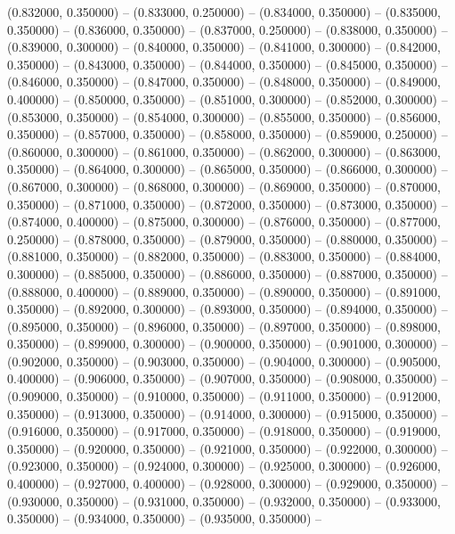 (0.832000, 0.350000) -- 
(0.833000, 0.250000) -- 
(0.834000, 0.350000) -- 
(0.835000, 0.350000) -- 
(0.836000, 0.350000) -- 
(0.837000, 0.250000) -- 
(0.838000, 0.350000) -- 
(0.839000, 0.300000) -- 
(0.840000, 0.350000) -- 
(0.841000, 0.300000) -- 
(0.842000, 0.350000) -- 
(0.843000, 0.350000) -- 
(0.844000, 0.350000) -- 
(0.845000, 0.350000) -- 
(0.846000, 0.350000) -- 
(0.847000, 0.350000) -- 
(0.848000, 0.350000) -- 
(0.849000, 0.400000) -- 
(0.850000, 0.350000) -- 
(0.851000, 0.300000) -- 
(0.852000, 0.300000) -- 
(0.853000, 0.350000) -- 
(0.854000, 0.300000) -- 
(0.855000, 0.350000) -- 
(0.856000, 0.350000) -- 
(0.857000, 0.350000) -- 
(0.858000, 0.350000) -- 
(0.859000, 0.250000) -- 
(0.860000, 0.300000) -- 
(0.861000, 0.350000) -- 
(0.862000, 0.300000) -- 
(0.863000, 0.350000) -- 
(0.864000, 0.300000) -- 
(0.865000, 0.350000) -- 
(0.866000, 0.300000) -- 
(0.867000, 0.300000) -- 
(0.868000, 0.300000) -- 
(0.869000, 0.350000) -- 
(0.870000, 0.350000) -- 
(0.871000, 0.350000) -- 
(0.872000, 0.350000) -- 
(0.873000, 0.350000) -- 
(0.874000, 0.400000) -- 
(0.875000, 0.300000) -- 
(0.876000, 0.350000) -- 
(0.877000, 0.250000) -- 
(0.878000, 0.350000) -- 
(0.879000, 0.350000) -- 
(0.880000, 0.350000) -- 
(0.881000, 0.350000) -- 
(0.882000, 0.350000) -- 
(0.883000, 0.350000) -- 
(0.884000, 0.300000) -- 
(0.885000, 0.350000) -- 
(0.886000, 0.350000) -- 
(0.887000, 0.350000) -- 
(0.888000, 0.400000) -- 
(0.889000, 0.350000) -- 
(0.890000, 0.350000) -- 
(0.891000, 0.350000) -- 
(0.892000, 0.300000) -- 
(0.893000, 0.350000) -- 
(0.894000, 0.350000) -- 
(0.895000, 0.350000) -- 
(0.896000, 0.350000) -- 
(0.897000, 0.350000) -- 
(0.898000, 0.350000) -- 
(0.899000, 0.300000) -- 
(0.900000, 0.350000) -- 
(0.901000, 0.300000) -- 
(0.902000, 0.350000) -- 
(0.903000, 0.350000) -- 
(0.904000, 0.300000) -- 
(0.905000, 0.400000) -- 
(0.906000, 0.350000) -- 
(0.907000, 0.350000) -- 
(0.908000, 0.350000) -- 
(0.909000, 0.350000) -- 
(0.910000, 0.350000) -- 
(0.911000, 0.350000) -- 
(0.912000, 0.350000) -- 
(0.913000, 0.350000) -- 
(0.914000, 0.300000) -- 
(0.915000, 0.350000) -- 
(0.916000, 0.350000) -- 
(0.917000, 0.350000) -- 
(0.918000, 0.350000) -- 
(0.919000, 0.350000) -- 
(0.920000, 0.350000) -- 
(0.921000, 0.350000) -- 
(0.922000, 0.300000) -- 
(0.923000, 0.350000) -- 
(0.924000, 0.300000) -- 
(0.925000, 0.300000) -- 
(0.926000, 0.400000) -- 
(0.927000, 0.400000) -- 
(0.928000, 0.300000) -- 
(0.929000, 0.350000) -- 
(0.930000, 0.350000) -- 
(0.931000, 0.350000) -- 
(0.932000, 0.350000) -- 
(0.933000, 0.350000) -- 
(0.934000, 0.350000) -- 
(0.935000, 0.350000) -- 

